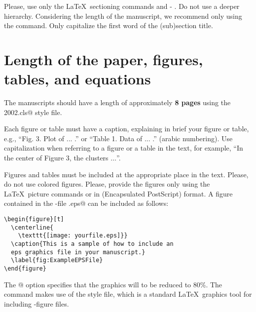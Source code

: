 \documentclass[runningheads]{d:/latex/gfkl2002}
\begin{document}
Please, use only the \LaTeX\ sectioning commands \verb@\section@ and 
\verb@\subsec@- \verb@tion@. Do not use a deeper hierarchy. Considering the 
length of the ma\-nu\-script, we recommend only using the \verb@\section@  
command. Only capitalize the first word of the (sub)section title. 

\section{Length of the paper, figures, tables, and equations}
The manuscripts should have a length of approximately {\bf 8 pages} using the 
\verb@gfkl2002.cls@ style file.

Each figure or table must have a caption, explaining in brief your 
figure or table, e.g., ``Fig. 3. Plot of ...  .'' or ``Table 1. Data 
of ...  .'' (arabic numbering).  Use capitalization when referring to a 
figure or a table in the text, for example, ``In the center of Figure 
3, the clusters $\ldots$''.

Figures and tables must be included at the appropriate place in the 
text. Please, do not use colored figures. Please, provide the 
figures only using the \LaTeX\ picture commands or in \verb@eps@ 
(Encapsulated PostScript) format.  A figure contained in the \verb@eps@-file  
\verb@yourfile.eps@ can be included as follows: 
\begin{verbatim}
\begin{figure}[t]
  \centerline{
    \texttt{[image: yourfile.eps]}}
  \caption{This is a sample of how to include an  
  eps graphics file in your manuscript.}
  \label{fig:ExampleEPSFile}
\end{figure}
\end{verbatim}
The \verb@[width=.8\textwidth]@ option specifies that the graphics will 
to be reduced to 80\%.  The \verb@{} command makes use 
of the \verb@graphicx@ style file, which is a standard \LaTeX\ graphics tool 
for including \verb@eps@-figure files.
\end{document}
